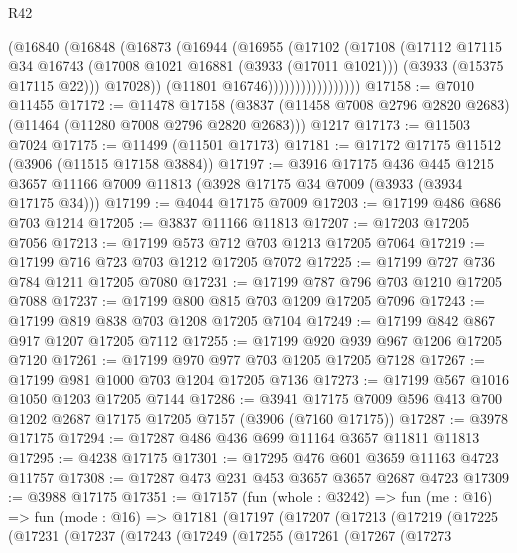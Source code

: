 \begin{lexlean}{R42}
\begin{coremodule}
                          (@16840
                            (@16848
                              (@16873
                                (@16944
                                  (@16955
                                    (@17102
                                      (@17108
                                        (@17112
                                          @17115
                                          @34
                                          @16743
                                          (@17008 @1021 @16881 (@3933 (@17011 @1021)))
                                          (@3933 (@15375 @17115 @22)))
                                        @17028))
                                    (@11801 @16746)))))))))))))))))
@17158 := @7010 @11455
@17172 := @11478
    @17158
    (@3837 (@11458 @7008 @2796 @2820 @2683) (@11464 (@11280 @7008 @2796 @2820 @2683)))
    @1217
@17173 := @11503 @7024
@17175 := @11499 (@11501 @17173)
@17181 := @17172 @17175 @11512 (@3906 (@11515 @17158 @3884))
@17197 := @3916
    @17175
    @436
    @445
    @1215
    @3657
    @11166
    @7009
    @11813
    (@3928 @17175 @34 @7009 (@3933 (@3934 @17175 @34)))
@17199 := @4044 @17175 @7009
@17203 := @17199 @486 @686 @703 @1214
@17205 := @3837 @11166 @11813
@17207 := @17203 @17205 @7056
@17213 := @17199 @573 @712 @703 @1213 @17205 @7064
@17219 := @17199 @716 @723 @703 @1212 @17205 @7072
@17225 := @17199 @727 @736 @784 @1211 @17205 @7080
@17231 := @17199 @787 @796 @703 @1210 @17205 @7088
@17237 := @17199 @800 @815 @703 @1209 @17205 @7096
@17243 := @17199 @819 @838 @703 @1208 @17205 @7104
@17249 := @17199 @842 @867 @917 @1207 @17205 @7112
@17255 := @17199 @920 @939 @967 @1206 @17205 @7120
@17261 := @17199 @970 @977 @703 @1205 @17205 @7128
@17267 := @17199 @981 @1000 @703 @1204 @17205 @7136
@17273 := @17199 @567 @1016 @1050 @1203 @17205 @7144
@17286 := @3941 @17175 @7009 @596 @413 @700 @1202 @2687 @17175 @17205 @7157 (@3906 (@7160 @17175))
@17287 := @3978 @17175
@17294 := @17287 @486 @436 @699 @11164 @3657 @11811 @11813
@17295 := @4238 @17175
@17301 := @17295 @476 @601 @3659 @11163 @4723 @11757
@17308 := @17287 @473 @231 @453 @3657 @3657 @2687 @4723
@17309 := @3988 @17175
@17351 := @17157
    (fun (whole : @3242) =>
    fun (me : @16) =>
    fun (mode : @16) =>
    @17181
      (@17197
        (@17207
          (@17213
            (@17219
              (@17225
                (@17231
                  (@17237
                    (@17243
                      (@17249
                        (@17255
                          (@17261
                            (@17267
                              (@17273

\end{coremodule}
\end{lexlean}
